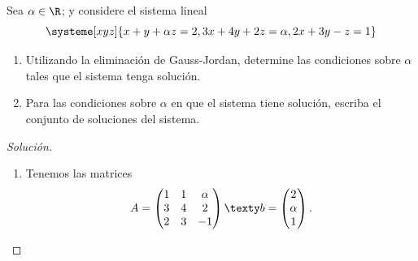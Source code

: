 \documentclass[a4,11pt]{aleph-notas}
\begin{document}
\begin{ejer}
    Sea $\alpha \in \R$; y considere el sistema lineal
    \[
        \systeme[xyz]{x+y+\alpha z=2, 3x+4y+2z=\alpha, 2x+3y-z=1}
    \]
    \begin{enumerate}
        \item Utilizando la eliminación de Gauss-Jordan, determine las condiciones sobre $\alpha$ tales que el sistema tenga solución.
        \item Para las condiciones sobre $\alpha$ en que el sistema tiene solución, escriba el conjunto de soluciones del sistema.
    \end{enumerate}
\end{ejer}

\begin{proof}[Solución]\hspace{0pt}
    \begin{enumerate}
    \item 
        Tenemos las matrices
        \[
            A = \begin{pmatrix}
            1&1&\alpha\\3&4&2\\2&3&-1
            \end{pmatrix}
            \texty
            b = \begin{pmatrix}
            2 \\ \alpha\\ 1
            \end{pmatrix}.
        \]


\end{enumerate}
\end{proof}
\end{document}
